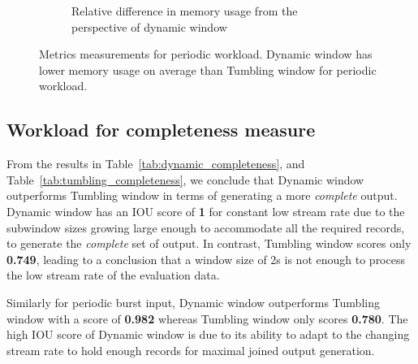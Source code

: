 \begin{figure}
\begin{subfigure}[b]{\columnwidth}
        \caption{Relative difference in memory usage from the perspective of dynamic window}
        \label{fig:periodic_mem_diff}
    \end{subfigure}

    \caption[Metrics measurements for periodic workload]
    {Metrics measurements for periodic workload. Dynamic window 
    has lower memory usage on average than Tumbling window for
periodic workload. }%
    \label{fig:periodic_measurement}
\end{figure}

\subsection{Workload for completeness measure}%
\label{sec:Workload for completeness measure}

From the results in Table~\ref{tab:dynamic_completeness}, and 
Table~\ref{tab:tumbling_completeness}, we conclude that Dynamic window 
outperforms Tumbling window in terms of generating a more \emph{complete} output. 
Dynamic window has an IOU score of \textbf{1} for constant low stream rate
due to the subwindow sizes growing large 
enough to accommodate all the required records, to generate the \emph{complete} set 
of output. In contrast, Tumbling window scores only \textbf{0.749}, leading to 
a conclusion that a window size of 2s is not enough to process the low stream rate 
of the evaluation data. 

Similarly for periodic burst input, Dynamic window outperforms Tumbling window with a
score of \textbf{0.982} whereas Tumbling window only scores \textbf{0.780}. The high IOU 
score of Dynamic window is due to its ability  
to adapt to the changing stream rate to hold enough 
records for maximal joined output generation.


\begin{table}[htbp]
    \centering
\caption{Dynamic window's completeness measurement.}
\label{tab:dynamic_completeness}
\end{table}

